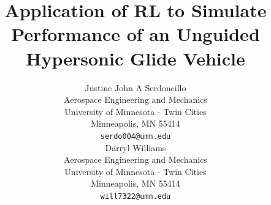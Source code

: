 \documentclass[11pt]{article} %
\title{Application of RL to Simulate Performance of an Unguided Hypersonic Glide Vehicle}
\author{
Justine John A Serdoncillo \\
Aerospace Engineering and Mechanics\\
University of Minnesota - Twin Cities\\
Minneapolis, MN  55414\\
\texttt{serdo004@umn.edu} \\
\And
Darryl Williams \\
Aerospace Engineering and Mechanics\\
University of Minnesota - Twin Cities\\
Minneapolis, MN  55414\\
\texttt{will7322@umn.edu} \\
}
\begin{document}
\maketitle

\end{document}

